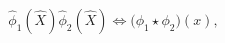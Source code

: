 \begin{equation}
 \hat\phi_1(\hat X)\hat\phi_2(\hat X) \Longleftrightarrow \Big(\phi_1
 \star\phi_2\Big)(x),
\end{equation}

